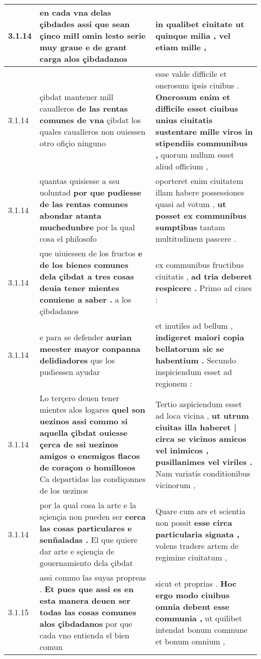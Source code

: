 \begin{tabular}{|p{1cm}|p{6.5cm}|p{6.5cm}|}
3.1.14 & en cada vna delas çibdades \textbf{ assi que sean çinco miłl omin lesto serie muy graue } e de grant carga alos çibdadanos & in qualibet ciuitate \textbf{ ut quinque milia , } vel etiam mille , \\\hline
3.1.14 & çibdat mantener mill caualleros \textbf{ de las rentas comunes de vna } çibdat los quales caualleros non ouiessen otro ofiçio ninguno & esse valde difficile et onerosum ipsis ciuibus . \textbf{ Onerosum enim et difficile esset ciuibus unius ciuitatis sustentare mille viros in stipendiis communibus , } quorum nullum esset aliud officium , \\\hline
3.1.14 & quantas quisiesse a ssu uoluntad \textbf{ por que pudiesse de las rentas comunes abondar atanta muchedunbre } por la qual cosa el philosofo & oporteret enim ciuitatem illam habere possessiones quasi ad votum , \textbf{ ut posset ex communibus sumptibus } tantam multitudinem pascere . \\\hline
3.1.14 & que uiuiessen de los fructos \textbf{ e de los bienes comunes dela çibdat a tres cosas deuia tener mientes conuiene a saber . } a los çibdadanos & ex communibus fructibus ciuitatis , \textbf{ ad tria deberet respicere . } Primo ad ciues : \\\hline
3.1.14 & e para se defender \textbf{ aurian meester mayor conpanna delidiadores } que los pudiessen ayudar & et inutiles ad bellum , \textbf{ indigeret maiori copia bellatorum sic se habentium . } Secundo inspiciendum esset ad regionem : \\\hline
3.1.14 & Lo terçero deuen tener mientes alos logares \textbf{ quel son uezinos assi commo si aquella çibdat ouiesse çerca de ssi uezinos amigos o enemigos flacos de coraçon o homillosos } Ca departidas las condiçonnes de los uezinos & Tertio aspiciendum esset ad loca vicina , \textbf{ ut utrum ciuitas illa haberet | circa se vicinos amicos vel inimicos , pusillanimes vel viriles . } Nam variatis conditionibus vicinorum , \\\hline
3.1.14 & por la qual cosa la arte e la sçiençia non pueden ser \textbf{ cerca las cosas particulares e senñaladas . } El que quiere dar arte e sçiençia de gouernamiento dela çibdat & Quare cum ars et scientia non possit \textbf{ esse circa particularia signata , } volens tradere artem de regimine ciuitatum , \\\hline
3.1.15 & assi commo las suyas propreas . \textbf{ Et pues que assi es en esta manera deuen ser todas las cosas comunes alos çibdadanos } por que cada vno entienda el bien comun & sicut et proprias . \textbf{ Hoc ergo modo ciuibus omnia debent esse communia , } ut quilibet intendat bonum commune et bonum omnium , \\\hline

\end{tabular}
